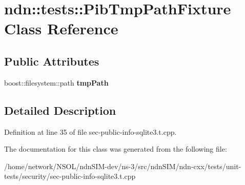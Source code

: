 \hypertarget{classndn_1_1tests_1_1PibTmpPathFixture}{}\section{ndn\+:\+:tests\+:\+:Pib\+Tmp\+Path\+Fixture Class Reference}
\label{classndn_1_1tests_1_1PibTmpPathFixture}
\subsection*{Public Attributes}
\begin{DoxyCompactItemize}
\item 
boost\+::filesystem\+::path {\bfseries tmp\+Path}\hypertarget{classndn_1_1tests_1_1PibTmpPathFixture_ac6c45a49aa58b2178a8c4ac8c4479022}{}\label{classndn_1_1tests_1_1PibTmpPathFixture_ac6c45a49aa58b2178a8c4ac8c4479022}

\end{DoxyCompactItemize}


\subsection{Detailed Description}


Definition at line 35 of file sec-\/public-\/info-\/sqlite3.\+t.\+cpp.



The documentation for this class was generated from the following file\+:\begin{DoxyCompactItemize}
\item 
/home/network/\+N\+S\+O\+L/ndn\+S\+I\+M-\/dev/ns-\/3/src/ndn\+S\+I\+M/ndn-\/cxx/tests/unit-\/tests/security/sec-\/public-\/info-\/sqlite3.\+t.\+cpp\end{DoxyCompactItemize}

